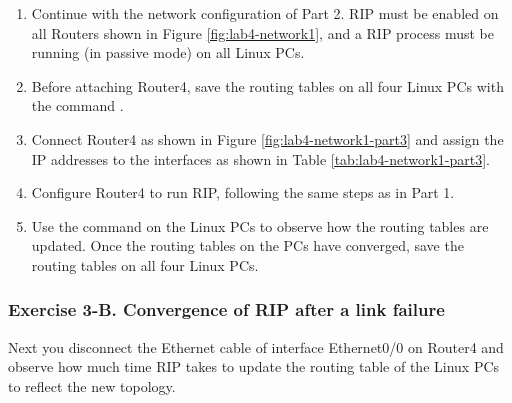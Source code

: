 \begin{enumerate}
	\item Continue with the network configuration of Part 2. RIP must be enabled on all Routers shown in Figure \ref{fig:lab4-network1}, and a RIP process must be running (in passive mode) on all Linux PCs.
	\item Before attaching Router4, save the routing tables on all four Linux PCs with the command .
	\item Connect Router4 as shown in Figure \ref{fig:lab4-network1-part3} and assign the IP addresses to the interfaces as shown in Table \ref{tab:lab4-network1-part3}.
	\item Configure Router4 to run RIP, following the same steps as in Part 1.
	\item Use the command  on the Linux PCs to observe how the routing tables are updated. Once the routing tables on the PCs have converged, save the routing tables on all four Linux PCs.
\end{enumerate}

\begin{questions}
\end{questions}

\subsubsection*{Exercise 3-B. Convergence of RIP after a link failure}

Next you disconnect the Ethernet cable of interface Ethernet0/0 on Router4 and observe how much time RIP takes to update the routing table of the Linux PCs to reflect the new topology.

